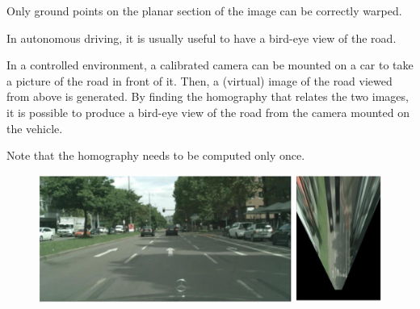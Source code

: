 \begin{descriptionlist}
        \begin{remark}
            Only ground points on the planar section of the image can be correctly warped.
        \end{remark}

        \begin{example}
            In autonomous driving, it is usually useful to have a bird-eye view of the road.

            In a controlled environment, a calibrated camera can be mounted on a car to take a picture of the road in front of it.
            Then, a (virtual) image of the road viewed from above is generated.
            By finding the homography that relates the two images, it is possible to produce a bird-eye view of the road from the camera mounted on the vehicle.

            Note that the homography needs to be computed only once.

            \begin{figure}[H]
                \centering
                \includegraphics[width=0.7\linewidth]{./img/inverse_perspective_mapping.png}
            \end{figure}
        \end{example}


\end{descriptionlist}

